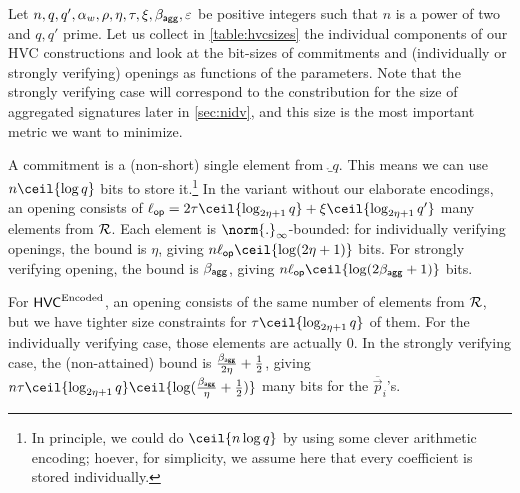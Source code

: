 \begin{remark}
Let $n, q, q',\alpha_w,\rho, \eta, \tau, \xi, \beta_{\mathsf{agg}}, \varepsilon$ be positive integers such that $n$ is a power of two and $q,q'$ prime.
Let us collect in \autoref{table:hvcsizes} the individual components of our HVC constructions and look at the bit-sizes of commitments and (individually or strongly verifying) openings as functions of the parameters.
Note that the strongly verifying case will correspond to the constribution for the size of aggregated signatures later in \autoref{sec:nidv}, and this size is the most important metric we want to minimize.

A commitment is a (non-short) single element from $\ring_q$. This means we can use $n\ceil{\log q}$ bits to store it.\footnote{In principle, we could do $\ceil{n\log q}$ by using some clever arithmetic encoding; hoever, for simplicity, we assume here that every coefficient is stored individually.}
In the variant without our elaborate encodings, an opening consists of $\oplen = 2\tau\ceil{\log_{2\eta+1}q} + \xi\ceil{\log_{2\eta+1}q'}$ many elements from $\mathcal{R}$.
Each element is $\norm{.}_\infty$-bounded: for individually verifying openings, the bound is $\eta$, giving $n\oplen\ceil{\log (2\eta+1)}$ bits. For strongly verifying opening, the bound is $\beta_{\mathsf{agg}}$, giving $n\oplen\ceil{\log (2\bagg+1)}$ bits.

For $\mathsf{HVC}^{\textrm{Encoded}}$, an opening consists of the same number of elements from $\mathcal{R}$, but we have tighter size constraints for $\tau\ceil{\log_{2\eta+1}q}$ of them. For the individually verifying case, those elements are actually 0. In the strongly verifying case, the (non-attained) bound is $\tfrac{\beta_{\mathsf{agg}}}{2\eta}+\frac12$, giving $n\tau\ceil{\log_{2\eta+1}q}\ceil{\log(\frac{\bagg}{\eta}+\frac12)}$ many bits for the $\overline{\vec{p}}_i$'s.


\end{remark}
